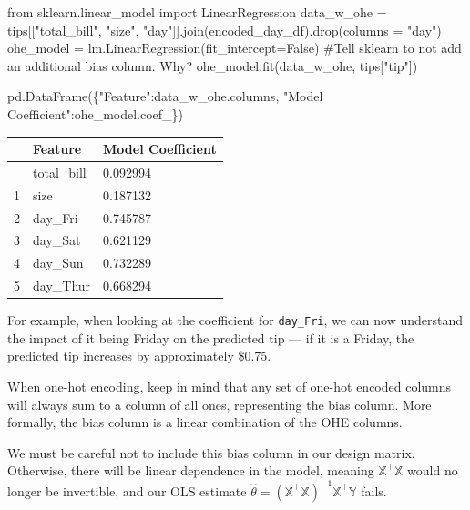 \documentclass[
  letterpaper,
  DIV=11,
  numbers=noendperiod]{scrreprt}
\newenvironment{Shaded}{\begin{snugshade}}{\end{snugshade}}
\newcommand{\CommentTok}[1]{\textcolor[rgb]{0.37,0.37,0.37}{#1}}
\newcommand{\ImportTok}[1]{\textcolor[rgb]{0.00,0.46,0.62}{#1}}
\newcommand{\NormalTok}[1]{\textcolor[rgb]{0.00,0.23,0.31}{#1}}
\newcommand{\OperatorTok}[1]{\textcolor[rgb]{0.37,0.37,0.37}{#1}}
\newcommand{\StringTok}[1]{\textcolor[rgb]{0.13,0.47,0.30}{#1}}
\newcommand{\VariableTok}[1]{\textcolor[rgb]{0.07,0.07,0.07}{#1}}
\begin{document}
\begin{Shaded}
\begin{Highlighting}[]
\ImportTok{from}\NormalTok{ sklearn.linear\_model }\ImportTok{import}\NormalTok{ LinearRegression}
\NormalTok{data\_w\_ohe }\OperatorTok{=}\NormalTok{ tips[[}\StringTok{"total\_bill"}\NormalTok{, }\StringTok{"size"}\NormalTok{, }\StringTok{"day"}\NormalTok{]].join(encoded\_day\_df).drop(columns }\OperatorTok{=} \StringTok{"day"}\NormalTok{)}
\NormalTok{ohe\_model }\OperatorTok{=}\NormalTok{ lm.LinearRegression(fit\_intercept}\OperatorTok{=}\VariableTok{False}\NormalTok{) }\CommentTok{\#Tell sklearn to not add an additional bias column. Why?}
\NormalTok{ohe\_model.fit(data\_w\_ohe, tips[}\StringTok{"tip"}\NormalTok{])}

\NormalTok{pd.DataFrame(\{}\StringTok{"Feature"}\NormalTok{:data\_w\_ohe.columns, }\StringTok{"Model Coefficient"}\NormalTok{:ohe\_model.coef\_\})}
\end{Highlighting}
\end{Shaded}

\begin{longtable}[]{@{}lll@{}}
\toprule\noalign{}
& Feature & Model Coefficient \\
\midrule\noalign{}
\endhead
\bottomrule\noalign{}
\endlastfoot
0 & total\_bill & 0.092994 \\
1 & size & 0.187132 \\
2 & day\_Fri & 0.745787 \\
3 & day\_Sat & 0.621129 \\
4 & day\_Sun & 0.732289 \\
5 & day\_Thur & 0.668294 \\
\end{longtable}

For example, when looking at the coefficient for \texttt{day\_Fri}, we
can now understand the impact of it being Friday on the predicted tip
--- if it is a Friday, the predicted tip increases by approximately
\$0.75.

When one-hot encoding, keep in mind that any set of one-hot encoded
columns will always sum to a column of all ones, representing the bias
column. More formally, the bias column is a linear combination of the
OHE columns.

We must be careful not to include this bias column in our design matrix.
Otherwise, there will be linear dependence in the model, meaning
\(\mathbb{X}^{\top}\mathbb{X}\) would no longer be invertible, and our
OLS estimate
\(\hat{\theta} = (\mathbb{X}^{\top}\mathbb{X})^{-1}\mathbb{X}^{\top}\mathbb{Y}\)
fails.
\end{document}
